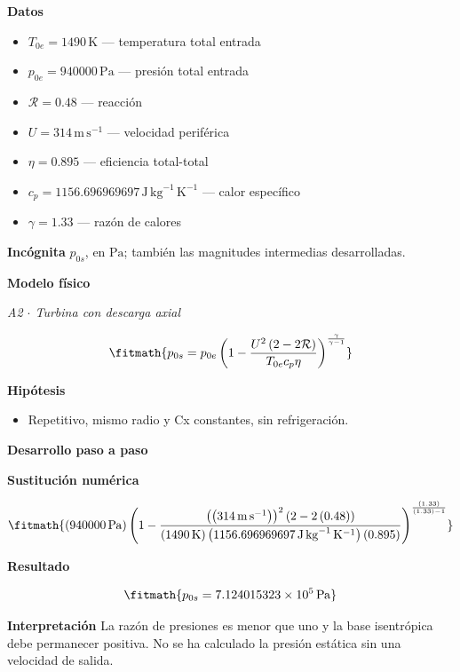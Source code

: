 \documentclass[10pt,openany]{book}
\begin{document}
\noindent\textbf{Datos}
\begin{itemize}
\item $T_{0e} = 1490\,\mathrm{K}$ — temperatura total entrada
\item $p_{0e} = 940000\,\mathrm{Pa}$ — presión total entrada
\item $\mathcal R = 0.48$ — reacción
\item $U = 314\,\mathrm{m}\,\mathrm{s}^{-1}$ — velocidad periférica
\item $\eta = 0.895$ — eficiencia total-total
\item $c_p = 1156.696969697\,\mathrm{J}\,\mathrm{kg}^{-1}\,\mathrm{K}^{-1}$ — calor específico
\item $\gamma = 1.33$ — razón de calores
\end{itemize}

\noindent\textbf{Incógnita}
$p_{0s}$, en $\mathrm{Pa}$; también las magnitudes intermedias desarrolladas.

\noindent\textbf{Modelo físico}

\noindent\textit{A2 \(\cdot\) Turbina con descarga axial}

\[
\fitmath{p_{0s}=p_{0e} \left(1 - \frac{U^{2} \left(2 - 2 \mathcal R\right)}{T_{0e} c_p \eta}\right)^{\frac{\gamma}{\gamma - 1}}}
\]

\noindent\textbf{Hipótesis}
\begin{itemize}
\item Repetitivo, mismo radio y Cx constantes, sin refrigeración.
\end{itemize}

\noindent\textbf{Desarrollo paso a paso}



\noindent\textbf{Sustitución numérica}

\[
\fitmath{\left(940000\,\mathrm{Pa}\right) \left(1 - \frac{\left(\left(314\,\mathrm{m}\,\mathrm{s}^{-1}\right)\right)^{2} \left(2 - 2 \left(0.48\right)\right)}{\left(1490\,\mathrm{K}\right) \left(1156.696969697\,\mathrm{J}\,\mathrm{kg}^{-1}\,\mathrm{K}^{-1}\right) \left(0.895\right)}\right)^{\frac{\left(1.33\right)}{\left(1.33\right) - 1}}}
\]

\noindent\textbf{Resultado}

\[
\fitmath{p_{0s}=7.124015323\times10^{5}\,\mathrm{Pa}}
\]

\noindent\textbf{Interpretación}
La razón de presiones es menor que uno y la base isentrópica debe permanecer positiva. No se ha calculado la presión estática sin una velocidad de salida.
\end{document}
